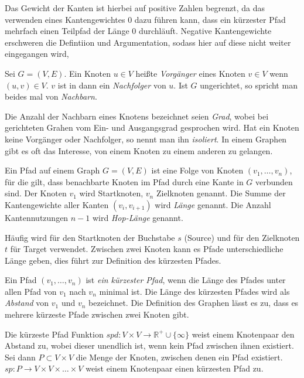 Das Gewicht der Kanten ist hierbei auf positive Zahlen begrenzt, da das verwenden eines Kantengewichtes $0$ dazu führen kann, dass ein kürzester Pfad mehrfach einen Teilpfad der Länge 0 durchläuft.
Negative Kantengewichte erschweren die Defintiion und Argumentation, sodass hier auf diese nicht weiter eingegangen wird,

\begin{definition}[Nachbar]
    Sei $G = (V, E)$. Ein Knoten $u \in V$ heißte \emph{Vorgänger} eines Knoten $v \in V$ wenn $(u, v) \in V$. $v$ ist in dann ein \emph{Nachfolger} von $u$.
    Ist $G$ ungerichtet, so spricht man beides mal von \emph{Nachbarn}.
\end{definition}

Die Anzahl der Nachbarn eines Knotens bezeichnet seien \emph{Grad}, wobei bei gerichteten Grahen vom Ein- und Ausgangsgrad gesprochen wird.
Hat ein Knoten keine Vorgänger oder Nachfolger, so nennt man ihn \emph{isoliert}.
In einem Graphen gibt es oft das Interesse, von einem Knoten zu einem anderen zu gelangen.

\begin{definition}[Pfad]
    Ein Pfad auf einem Graph $G = (V, E)$ ist eine Folge von Knoten $(v_1, \dotsc, v_n)$, für die gilt, dass benachbarte Knoten im Pfad durch eine Kante in $G$ verbunden sind.
    Der Knoten $v_1$ wird Startknoten, $v_n$ Zielknoten genannt.
    Die Summe der Kantengewichte aller Kanten $(v_i, v_{i + 1})$ wird \emph{Länge} genannt.
    Die Anzahl Kantennutzungen $n - 1$ wird \emph{Hop-Länge} genannt.
\end{definition}

Häufig wird für den Startknoten der Buchstabe $s$ (Source) und für den Zielknoten $t$ für Target verwendet.
Zwischen zwei Knoten kann es Pfade unterschiedliche Länge geben, dies führt zur Definition des kürzesten Pfades.

\begin{definition}
    Ein Pfad $(v_1, \dotsc, v_n)$ ist \emph{ein kürzester Pfad}, wenn die Länge des Pfades unter allen Pfad von $v_1$ nach $v_n$ minimal ist.
    Die Länge des kürzesten Pfades wird als \emph{Abstand} von $v_1$ und $v_n$ bezeichnet.
    Die Definition des Graphen lässt es zu, dass es mehrere kürzeste Pfade zwischen zwei Knoten gibt.

    Die kürzeste Pfad Funktion ${spd} \colon V \times V \to \mathbb{R}^+ \cup \{ \infty \} $ weist einem Knotenpaar den Abstand zu, wobei dieser unendlich ist, wenn kein Pfad zwischen ihnen existiert.
    Sei dann $P \subset V \times V$ die Menge der Knoten, zwischen denen ein Pfad existiert.
    ${sp} \colon P \to V \times V \times \dots \times V$ weist einem Knotenpaar einen kürzesten Pfad zu.
\end{definition}

